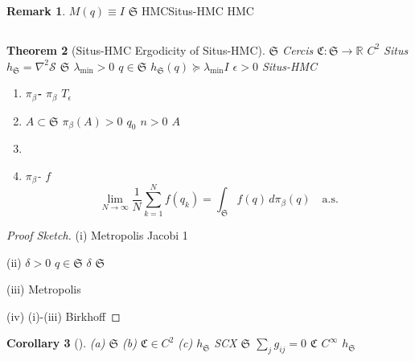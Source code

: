 \documentclass[12pt,a4paper]{article}
\theoremstyle{plain}
\newtheorem{theorem}{ Theorem}[section]
\newtheorem{corollary}[theorem]{ Corollary}
\theoremstyle{definition}
\newtheorem{remark}[theorem]{ Remark}
\newcommand{\R}{\mathbb{R}}
\newcommand{\Situs}{\mathfrak{S}}
\newcommand{\Cercis}{\mathfrak{C}}
\begin{document}
\begin{remark}
 $M(q) \equiv I$ $\Situs$ 
HMCSitus-HMC  HMC \textbf{}
\end{remark}

\subsection{}

\begin{theorem}[Situs-HMC  Ergodicity of Situs-HMC]
\label{thm:ergodicity}
 $\Situs$ Cercis  $\Cercis: \Situs \to \R$ 
$C^2$  Situs  $h_{\Situs} = \nabla^2 \mathcal{S}$  $\Situs$ 
 $\lambda_{\min} > 0$  $q \in \Situs$ 
$h_{\Situs}(q) \succeq \lambda_{\min} I$
$\epsilon > 0$  Situs-HMC 

\begin{enumerate}[label=(\roman*)]
    \item \textbf{$\pi_\beta$-} $\pi_\beta$  $T_\epsilon$ 
    \item \textbf{}  $A \subset \Situs$  $\pi_\beta(A) > 0$
         $q_0$  $n > 0$  $A$
    \item \textbf{} 
    \item \textbf{}  $\pi_\beta$- $f$
        \begin{equation}
            \lim_{N \to \infty} \frac{1}{N} \sum_{k=1}^N f(q_k) = \int_{\Situs} f(q) \, d\pi_\beta(q) \quad \text{a.s.}
        \end{equation}
\end{enumerate}
\end{theorem}

\begin{proof}[ Proof Sketch]
(i)  Metropolis 
 Jacobi  1 

(ii)  $\delta > 0$  $q \in \Situs$
 $\delta$  $\Situs$ 


(iii)  Metropolis 

(iv)  (i)-(iii) Birkhoff 

\end{proof}

\begin{corollary}[]
(a) $\Situs$ (b) $\Cercis \in C^2$
(c) $h_{\Situs}$  SCX 
$\Situs$  $\sum_j g_{ij} = 0$ 
$\Cercis$  $C^\infty$ $h_{\Situs}$ 

\end{corollary}

\subsection{}
\end{document}
